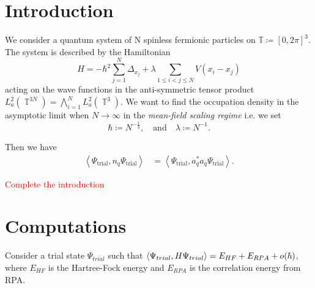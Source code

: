 \documentclass[sn-mathphys,Numbered, a4paper ,nocrop]{sn-jnl}%
\DeclareMathOperator{\T}{\mathbb{T}}
\newcommand{\eva}[1]{\left\langle #1 \right\rangle}
\theoremstyle{plain}
\theoremstyle{definition}
\theoremstyle{remark}
\theoremstyle{plain}
\theoremstyle{definition}
\theoremstyle{remark}
\begin{document}
\section{Introduction}\label{sec1}
We consider a quantum system of N spinless fermionic particles on $\mathbb{T}\coloneq [0,2\pi]^3$. The system is described by the Hamiltonian
\begin{equation}
    H = -\hbar^2\sum\limits_{j=1}^{N}\Delta_{x_j} + \lambda\!\!\!\sum\limits_{1\leq i < j \leq N } V(x_i - x_j)
\end{equation}
acting on the wave functions in the anti-symmetric tensor product $L^2_a(\T^{3N}) = \bigwedge_{i=1}^N L^2_a(\T^3)$.
We want to find the occupation density in the asymptotic limit when $N\rightarrow\infty$ in the \textit{mean-field scaling regime} i.e. we set
\begin{equation}
    \hbar\coloneq N^{-\frac{1}{3}}, \quad\text{and}\quad \lambda \coloneq N^{-1}.
\end{equation}



Then we have
\begin{align}
    \eva{\Psi_{\text{trial}},n_q\Psi_{\text{trial}}} &= \eva{\Psi_{\text{trial}},a^*_qa_q\Psi_{\text{trial}}} .
\end{align}

\textcolor{red}{Complete the introduction}


\section{Computations}\label{sec2}

Consider a trial state $\Psi_{trial}$ such that $\braket{\Psi_{trial},H\Psi_{trial}} = E_{HF} + E_{RPA}+ o(\hbar) $, where $E_{HF}$ is the Hartree-Fock energy and $E_{RPA}$ is the correlation energy from RPA.
\end{document}
